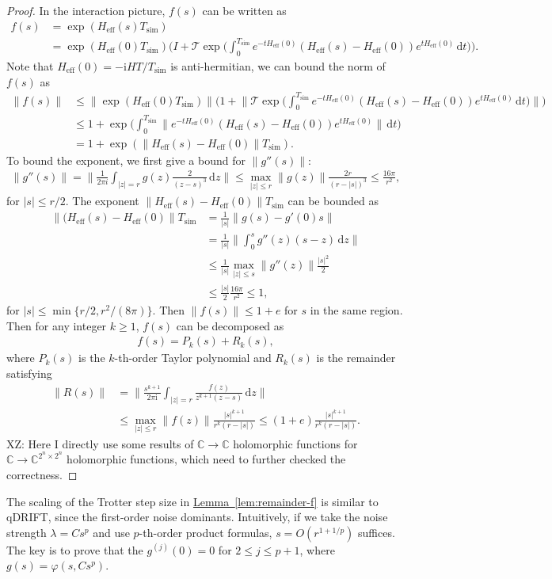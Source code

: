 \documentclass[11pt]{article}
\newcommand{\lem}[1]{\hyperref[lem:#1]{Lemma~\ref*{lem:#1}}}
\renewcommand{\i}{\mathrm{i}}
\renewcommand{\d}{\mathrm{d}}
\newcommand{\T}{\mathcal{T}}
\newcommand{\B}{\Big}
\newcommand{\simu}{\mathrm{sim}}
\newcommand{\He}{H_{\mathrm{eff}}}
\newcommand{\xz}[1]{{\color{cyan} XZ: #1}}
\begin{document}
\begin{proof}
    
    In the interaction picture, $f(s)$ can be written as \begin{align*}
        f(s)&=\exp(\He(s) T_{\simu}) \\
        &= \exp(\He(0)T_{\simu})\B(I+\T\exp\B(\int_{0}^{T_{\simu}}e^{-t\He(0)} (\He(s)-\He(0))e^{t\He(0)}\, \d t\B)\B).
    \end{align*}
    Note that $\He(0)=-\i HT/T_{\simu}$ is anti-hermitian, we can bound the norm of $f(s)$ as \begin{align*}
        \|f(s)\|&\le \|\exp(\He(0)T_{\simu})\|\B(1+\B\|\T\exp\B(\int_{0}^{T_{\simu}}e^{-t\He(0)} (\He(s)-\He(0))e^{t\He(0)}\, \d t\B)\B\|\B)\\
        &\le 1+\exp\B(\int_{0}^{T_{\simu}}\B\|e^{-t\He(0)} (\He(s)-\He(0))e^{t\He(0)}\B\|\, \d t\B)\\
        &=1+\exp(\|\He(s)-\He(0)\|T_{\simu}).
    \end{align*}
    To bound the exponent, we first give a bound for $\|g''(s)\|$: 
    \begin{align*}
        \|g''(s)\| = \B\|\frac{1}{2\pi i}\int_{|z|=r} g(z) \frac{2}{(z-s)^3}\, \d z\B\| \le \max_{|z|\le r}\|g(z)\| \frac{2r}{(r-|s|)^3}\le \frac{16\pi}{r^2} ,
    \end{align*}
    for $|s|\le r/2$.
    The exponent $\|\He(s)-\He(0)\|T_{\simu}$ can be bounded as \begin{align*}
        \|(\He(s)-\He(0)\|T_{\simu} &= \frac{1}{|s|}\|g(s)-g'(0)s\|\\
        &=\frac{1}{|s|}\B\|\int_0^s g''(z)(s-z)\, \d z\B\| \\
        &\le \frac{1}{|s|}\max_{|z|\le s}\|g''(z)\| \frac{|s|^2}{2} \\
        &\le \frac{|s|}{2}\frac{16\pi}{r^2} \le 1,
    \end{align*}
    for $|s|\le \min\{r/2,r^2/(8\pi)\}$. Then $\|f(s)\|\le 1+e$ for $s$ in the same region. Then for any integer $k\ge 1$, $f(s)$ can be decomposed as \begin{align*}
        f(s) = P_k(s)+R_k(s),
    \end{align*}
    where $P_k(s)$ is the $k$-th-order Taylor polynomial and $R_k(s)$ is the remainder satisfying \begin{align*}
        \|R(s)\| &=\B\|\frac{s^{k+1}}{2\pi \i}\int_{|z|=r}\frac{f(z)}{z^{k+1}(z-s)}\, \d z\B\|\\
        &\le \max_{|z|\le r}\|f(z)\| \frac{|s|^{k+1}}{r^{k}(r-|s|)}\le (1+e)\frac{|s|^{k+1}}{r^{k}(r-|s|)}.
    \end{align*}
    \xz{Here I directly use some results of $\mathbb{C}\to \mathbb{C}$ holomorphic functions for $\mathbb{C}\to \mathbb{C}^{2^n \times 2^n}$ holomorphic functions, which need to further checked the correctness.}
\end{proof}
The scaling of the Trotter step size in \lem{remainder-f} is similar to qDRIFT, since the first-order noise dominants. Intuitively, if we take the noise strength $\lambda = Cs^{p}$ and use $p$-th-order product formulas, $s=O(r^{1+1/p})$ suffices. The key is to prove that the $g^{(j)}(0)=0$ for $2\le j\le p+1$, where $g(s) = \varphi(s, Cs^p)$.
\end{document}

